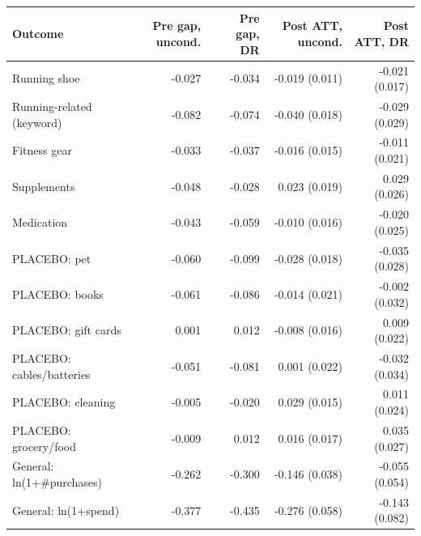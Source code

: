 \begin{tabular}{lrrrr}
\toprule
Outcome & Pre gap, uncond. & Pre gap, DR & Post ATT, uncond. & Post ATT, DR \\
\midrule
Running shoe & -0.027 & -0.034 & -0.019 (0.011) & -0.021 (0.017) \\
Running-related (keyword) & -0.082 & -0.074 & -0.040 (0.018) & -0.029 (0.029) \\
Fitness gear & -0.033 & -0.037 & -0.016 (0.015) & -0.011 (0.021) \\
Supplements & -0.048 & -0.028 & 0.023 (0.019) & 0.029 (0.026) \\
Medication & -0.043 & -0.059 & -0.010 (0.016) & -0.020 (0.025) \\
PLACEBO: pet & -0.060 & -0.099 & -0.028 (0.018) & -0.035 (0.028) \\
PLACEBO: books & -0.061 & -0.086 & -0.014 (0.021) & -0.002 (0.032) \\
PLACEBO: gift cards & 0.001 & 0.012 & -0.008 (0.016) & 0.009 (0.022) \\
PLACEBO: cables/batteries & -0.051 & -0.081 & 0.001 (0.022) & -0.032 (0.034) \\
PLACEBO: cleaning & -0.005 & -0.020 & 0.029 (0.015) & 0.011 (0.024) \\
PLACEBO: grocery/food & -0.009 & 0.012 & 0.016 (0.017) & 0.035 (0.027) \\
General: ln(1+\#purchases) & -0.262 & -0.300 & -0.146 (0.038) & -0.055 (0.054) \\
General: ln(1+spend) & -0.377 & -0.435 & -0.276 (0.058) & -0.143 (0.082) \\
\bottomrule
\end{tabular}
